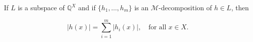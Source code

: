 If $L$ is a subspace of $\mathbb{Q}^X$ and if $\{h_1, \ldots, h_m\}$ is an $\mathcal{M}$-decomposition of $h \in L$, then

$$|h(x)| = \sum_{i=1}^{m} |h_i(x)|, \quad \text{for all } x \in X.$$
